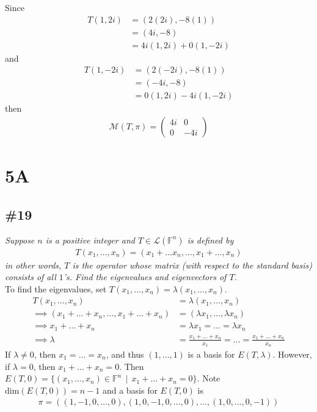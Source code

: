 \documentclass[12pt]{article}
\newcommand{\suchthat}{\, \mid \,}
\begin{document}
\begin{enumerate}[\it\ \ (a)\ \ ]
		\noindent Since
		\begin{align*}
			T(1, 2i) &= (2(2i), -8(1)) \\
			&= (4i, -8) \\
			&= 4i(1, 2i) + 0(1, -2i)
		\end{align*}
		and
		\begin{align*}
		T(1, -2i) &= (2(-2i), -8(1)) \\
		&= (-4i, -8) \\
		&= 0(1, 2i) -4i(1, -2i)
		\end{align*}
		then 
		\begin{align*}
			\mathcal{M}(T, \pi) = \left(\begin{array}{cc}
				4i & 0 \\
				0 & -4i
			\end{array}\right)
		\end{align*}
	\end{enumerate}
	
\section*{5A}
\subsection*{\#19}
	{\it Suppose $n$ is a positive integer and $T \in \mathcal{L}(\mathbb{F}^n)$ is defined by}
	\begin{align*}
		T(x_1, \dots, x_n) = (x_1 + \dots x_n, \dots, x_1 + \dots, x_n)
	\end{align*}
	{\it in other words, $T$ is the operator whose matrix (with respect to the standard basis) consists of all $1$'s.  Find the eigenvalues and eigenvectors of $T$.}\\
	
	\noindent To find the eigenvalues, set $T(x_1, \dots, x_n) = \lambda(x_1, \dots, x_n)$.
	\begin{align*}
		T(x_1, \dots, x_n) &= \lambda(x_1, \dots, x_n) \\
		\implies (x_1 + \dots + x_n, \dots, x_1 + \dots + x_n) &= (\lambda x_1, \dots, \lambda x_n) \\
		\implies x_1 + \dots + x_n &= \lambda x_1 = \dots = \lambda x_n\\
		\implies \lambda &= \frac{x_1 + \dots + x_n}{x_1} = \dots = \frac{x_1 + \dots + x_n}{x_n}
	\end{align*}
	If $\lambda \neq 0$, then $x_1 = \dots = x_n$, and thus $(1, \dots, 1)$ is a basis for $E(T, \lambda)$.  However, if $\lambda = 0$, then $x_1 + \dots + x_n = 0$.  Then $E(T, 0) = \{(x_1, \dots, x_n) \in \mathbb{F}^n \suchthat x_1 + \dots + x_n = 0\}$.  Note $\text{dim}(E(T, 0)) = n-1$ and a basis for $E(T, 0)$ is
	\begin{align*}
		\pi = ((1, -1, 0, \dots, 0), (1, 0, -1, 0, \dots, 0), \dots, (1, 0, \dots, 0, -1))
	\end{align*}
\end{document}
